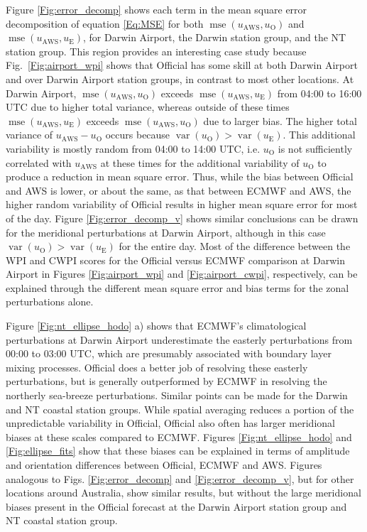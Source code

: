 \documentclass{ametsoc}
\DeclareMathOperator{\mse}{mse}
\DeclareMathOperator{\var}{var}
\begin{document}
Figure \ref{Fig:error_decomp} shows each term in the mean square error decomposition of equation \ref{Eq:MSE} for both $\mse\left(u_\text{AWS}, u_\text{O}\right)$ and $\mse\left(u_\text{AWS}, u_\text{E}\right)$, for Darwin Airport, the Darwin station group, and the NT station group. This region provides an interesting case study because Fig.~\ref{Fig:airport_wpi} shows that Official has some skill at both Darwin Airport and over Darwin Airport station groups, in contrast to most other locations. At Darwin Airport, $\mse\left(u_\text{AWS}, u_\text{O}\right)$ exceeds $\mse\left(u_\text{AWS}, u_\text{E}\right)$ from 04:00 to 16:00 UTC due to higher total variance, whereas outside of these times $\mse\left(u_\text{AWS}, u_\text{E}\right)$ exceeds $\mse\left(u_\text{AWS}, u_\text{O}\right)$ due to larger bias. The higher total variance of $u_\text{AWS} - u_\text{O}$ occurs because $\var\left(u_\text{O}\right) > \var\left(u_\text{E}\right)$. This additional variability is mostly random from 04:00 to 14:00 UTC, i.e. $u_\text{O}$ is not sufficiently correlated with $u_\text{AWS}$ at these times for the additional variability of $u_\text{O}$ to produce a reduction in mean square error. Thus, while the bias between Official and AWS is lower, or about the same, as that between ECMWF and AWS, the higher random variability of Official results in higher mean square error for most of the day. Figure \ref{Fig:error_decomp_v} shows similar conclusions can be drawn for the meridional perturbations at Darwin Airport, although in this case $\var\left(u_\text{O}\right) > \var\left(u_\text{E}\right)$ for the entire day. Most of the difference between the WPI and CWPI scores for the Official versus ECMWF comparison at Darwin Airport in Figures \ref{Fig:airport_wpi} and \ref{Fig:airport_cwpi}, respectively, can be explained through the different mean square error and bias terms for the zonal perturbations alone. 

Figure \ref{Fig:nt_ellipse_hodo} a) shows that ECMWF's climatological perturbations at Darwin Airport underestimate the easterly perturbations from 00:00 to 03:00 UTC, which are presumably associated with boundary layer mixing processes. Official does a better job of resolving these easterly perturbations, but is generally outperformed by ECMWF in resolving the northerly sea-breeze perturbations. Similar points can be made for the Darwin and NT coastal station groups. While spatial averaging reduces a portion of the unpredictable variability in Official, Official also often has larger meridional biases at these scales compared to ECMWF. Figures \ref{Fig:nt_ellipse_hodo} and \ref{Fig:ellipse_fits} show that these biases can be explained in terms of amplitude and orientation differences between Official, ECMWF and AWS. Figures analogous to Figs. \ref{Fig:error_decomp} and \ref{Fig:error_decomp_v}, but for other locations around Australia, show similar results, but without the large meridional biases present in the Official forecast at the Darwin Airport station group and NT coastal station group.   
\end{document}

